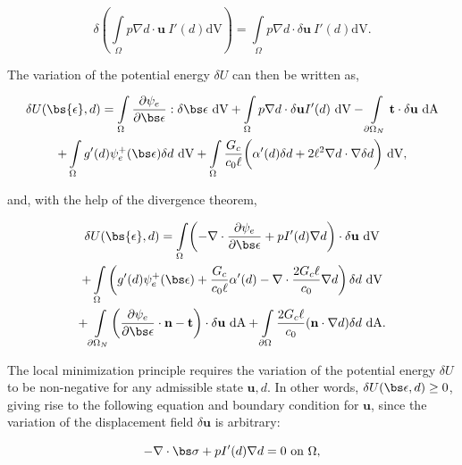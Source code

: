 \begin{equation}\label{dry variation}
    \delta \left( \int\limits_{\Omega} p \nabla d\cdot\textbf{u}\ I'(d)\text{dV} \right) = \int\limits_{\Omega} p \nabla d\cdot\delta\textbf{u}\ I'(d)\text{dV}.
\end{equation}

\noindent The variation of the potential energy $\delta U$ can then be written as,

\begin{multline}
    \delta U(\bs{\epsilon},d) = \int\limits_{\Omega}\dfrac{\partial\psi_e}{\partial \bs \epsilon}:\delta\bs\epsilon\ \text{dV} + \int\limits_{\Omega} p \nabla d\cdot\delta\textbf{u}I'(d)\ \text{dV} 
    - \int\limits_{\partial \Omega_N} \textbf{t}\cdot\delta\textbf{u} \ \text{dA} \\
    + \int\limits_{\Omega}g'(d) \psi_e^+(\bs\epsilon)\delta d\ \text{dV}
    + \int\limits_{\Omega}\dfrac{G_c}{c_0\ell}\bigg( \alpha'(d)\delta d + 2\ell^2\nabla d \cdot \nabla \delta d\bigg)\ \text{dV},
\end{multline}

\noindent and, with the help of the divergence theorem, 

\begin{multline}
    \delta U(\bs{\epsilon},d) = \int\limits_{\Omega}\biggl(-\nabla \cdot \dfrac{\partial\psi_e}{\partial \bs \epsilon} + pI'(d) \nabla d\biggr)\cdot\delta\textbf{u}\ \text{dV} \\
    + \int\limits_{\Omega}\left(g'(d) \psi_e^+(\bs\epsilon)
    + \dfrac{G_c}{c_0\ell}\alpha'(d) - \nabla \cdot\dfrac{2G_c\ell}{c_0}\nabla d \right)\delta d\ \text{dV} \\
    + \int\limits_{\partial \Omega_N}\biggl( \dfrac{\partial\psi_e}{\partial \bs \epsilon}\cdot\textbf{n}  -\textbf{t}\biggr)\cdot\delta\textbf{u} \ \text{dA}
    + \int\limits_{\partial\Omega} \dfrac{2G_c\ell}{c_0}(\textbf{n}\cdot\nabla d)  \delta d\ \text{dA}.
\end{multline}

The local minimization principle requires the variation of the potential energy $\delta U$ to be non-negative for any admissible state $\textbf{u},d$. In other words, $\delta U(\bs\epsilon, d) \ge 0$, giving rise to the following equation and boundary condition for $\textbf{u}$, since the variation of the displacement field $\delta \textbf{u}$ is arbitrary:

\begin{equation}\label{disp equation}
    -\nabla \cdot \bs \sigma  + pI'(d) \nabla d = 0 \text{ on }\Omega,
\end{equation}

